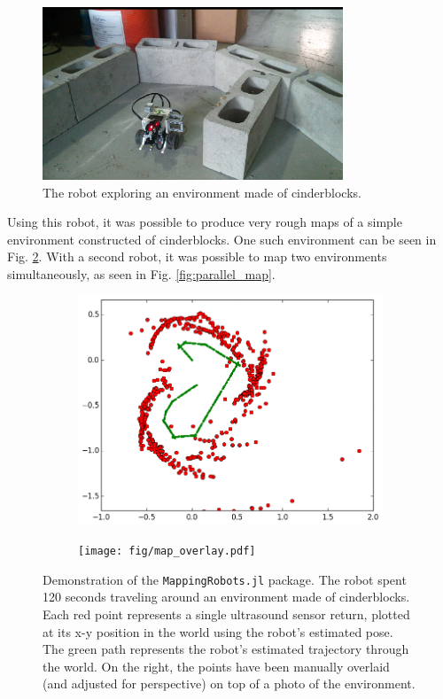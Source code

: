 \documentclass[]{article}
\begin{document}
\begin{figure}[htbp!]
    \centering
    \includegraphics[width=0.8\textwidth, clip=true, trim=2in 0 2in 3in]{fig/robot_in_environment.png}
    \caption{The robot exploring an environment made of cinderblocks.}
    \label{fig:robot_in_environment}
\end{figure}

Using this robot, it was possible to produce very rough maps of a simple environment constructed of cinderblocks. One such environment can be seen in Fig. \ref{fig:map_overlay}. With a second robot, it was possible to map two environments simultaneously, as seen in Fig. \ref{fig:parallel_map}. 

\begin{figure}[htbp!]
    \centering
    \begin{subfigure}[htbp]{0.45\textwidth}
        \includegraphics[width=\textwidth]{fig/N9_map_A_v1.png}
    \end{subfigure}
    \begin{subfigure}[htbp]{0.45\textwidth}
        \texttt{[image: fig/map\_overlay.pdf]}
    \end{subfigure}
    \caption{Demonstration of the \texttt{MappingRobots.jl} package. The robot spent 120 seconds traveling around an environment made of cinderblocks. Each red point represents a single ultrasound sensor return, plotted at its x-y position in the world using the robot's estimated pose. The green path represents the robot's estimated trajectory through the world. On the right, the points have been manually overlaid (and adjusted for perspective) on top of a photo of the environment.}
    \label{fig:map_overlay}
\end{figure}
\end{document}
